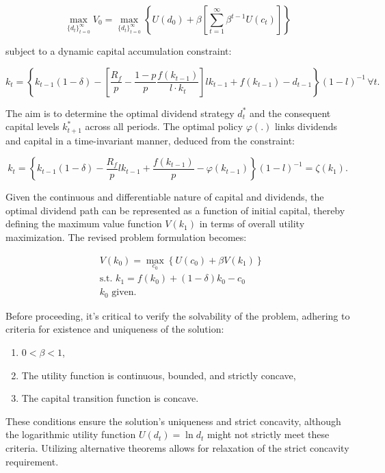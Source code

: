 \documentclass[12pt]{article}
\begin{document}
\begin{equation}
    \max _{\{d_t\}_{t=0}^{\infty}} V_0 = \max _{\{d_t\}_{t=0}^{\infty}} \left\{U(d_0) + \beta \left[\sum_{t=1}^{\infty} \beta^{t-1} U(c_t)\right]\right\}
\end{equation}


subject to a dynamic capital accumulation constraint:

\[
k_t = \left\{k_{t-1}(1 - \delta) - \left[\frac{R_f}{p} - \frac{1-p}{p} \frac{f(k_{t-1})}{l \cdot k_t}\right] l k_{t-1} + f(k_{t-1}) - d_{t-1}\right\}(1-l)^{-1} \, \forall t.
\]

The aim is to determine the optimal dividend strategy \(d_t^*\) and the consequent capital levels \(k_{t+1}^*\) across
all periods. The optimal policy \(\varphi(.)\) links dividends and capital in a time-invariant manner, deduced from the
constraint:

\[
k_t = \left\{k_{t-1}(1 - \delta) - \frac{R_f}{p} l k_{t-1} + \frac{f(k_{t-1})}{p} - \varphi(k_{t-1})\right\}(1-l)^{-1} = \zeta(k_1).
\]

Given the continuous and differentiable nature of capital and dividends, the optimal dividend path can be represented as
a function of initial capital, thereby defining the maximum value function \(V(k_1)\) in terms of overall utility
maximization. The revised problem formulation becomes:


\begin{align}
    & V(k_0) = \max _{c_0} \left\{U(c_0) + \beta V(k_1)\right\} \\
    & \text{s.t. } k_1 = f(k_0) + (1-\delta)k_0 - c_0 \\
    & k_0 \text{ given.}
\end{align}


Before proceeding, it's critical to verify the solvability of the problem, adhering to criteria for existence and uniqueness of the solution: 
\begin{enumerate}
    \item \(0 < \beta < 1\),
    \item The utility function is continuous, bounded, and strictly concave,
    \item The capital transition function is concave.

\end{enumerate}


These conditions ensure the solution's uniqueness and strict concavity, although the logarithmic utility function
\(U(d_t) = \ln{d_t}\) might  not strictly meet these criteria. Utilizing alternative theorems allows for relaxation of
the strict concavity requirement.
\end{document}
